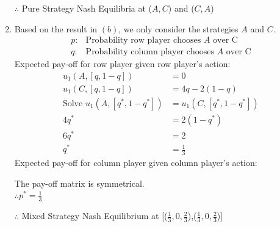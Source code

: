 \documentclass[12pt]{article}
\newenvironment{solution}[2][Solution]{\begin{trivlist}
\item[\hskip \labelsep {\bfseries #1}]}{\end{trivlist}}
\begin{document}
\begin{solution}{}
\begin{enumerate}[label=(\alph*)]
\begin{center}
\end{center}
\begin{center}
$\therefore$ Pure Strategy Nash Equilibria at ($A,C$) and ($C,A$)
\end{center}
\item Based on the result in $(b)$, we only consider the strategies $A$ and $C$.\\
$$
\begin{array}{rl}
p: & \text{Probability row player chooses }A\text{ over C}\\
q: & \text{Probability column player chooses }A\text{ over C}
\end{array}
$$
Expected pay-off for row player given row player's action:\\

\begin{align*}
u_1(A,[q,1-q])&=0\\
u_1(C,[q,1-q])&=4q-2(1-q)\\
\text{Solve }u_1(A,[q^*,1-q^*])&=u_1(C,[q^*,1-q^*])\\
4q^*&=2(1-q^*)\\
6q^*&=2\\
q^*&=\frac{1}{3}
\end{align*}
Expected pay-off for column player given column player's action:\\

\begin{center}
The pay-off matrix is symmetrical.\\
$\therefore p^*=\frac{1}{3}$
\end{center}
\begin{center}
$\therefore$ Mixed Strategy Nash Equilibrium at [($\frac{1}{3},0,\frac{2}{3}$),($\frac{1}{3},0,\frac{2}{3}$)]
\end{center}
\end{enumerate}
\end{solution}
\end{document}
